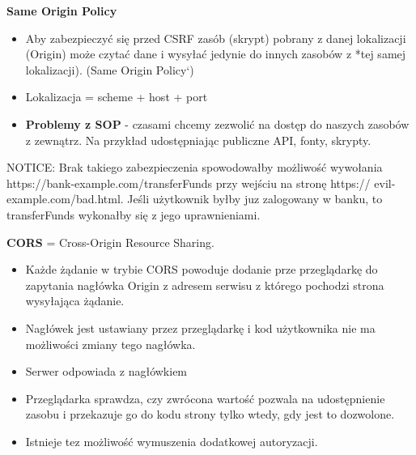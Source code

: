 \documentclass[../main.tex]{subfiles}
\begin{document}
    \textbf{Same Origin Policy}
    \begin{itemize}
        \item Aby zabezpieczyć się przed CSRF zasób (skrypt) pobrany z danej lokalizacji
        (Origin) może czytać dane i wysyłać jedynie do innych zasobów z *tej samej
        lokalizacji). (Same Origin Policy`)
        \item Lokalizacja = scheme + host + port
        \item \textbf{Problemy z SOP} - czasami chcemy zezwolić na dostęp do naszych zasobów z zewnątrz. Na
        przykład udostępniając publiczne API, fonty, skrypty.
    \end{itemize}

    NOTICE: Brak takiego zabezpieczenia spowodowałby możliwość wywołania
    https://bank-example.com/transferFunds przy wejściu na stronę https://
    evil-example.com/bad.html. Jeśli użytkownik byłby juz zalogowany w banku, to
    transferFunds wykonałby się z jego uprawnieniami.

    \textbf{CORS} = Cross-Origin Resource Sharing.
    \begin{itemize}
        \item Każde żądanie w trybie CORS powoduje dodanie prze przeglądarkę do
        zapytania nagłówka Origin z adresem serwisu z którego pochodzi strona
        wysyłająca żądanie.
        \item Nagłówek jest ustawiany przez przeglądarkę i kod użytkownika nie ma
        możliwości zmiany tego nagłówka.
        \item Serwer odpowiada z nagłówkiem
        \item Przeglądarka sprawdza, czy zwrócona wartość pozwala na udostępnienie
        zasobu i przekazuje go do kodu strony tylko wtedy, gdy jest to dozwolone.
        \item Istnieje tez możliwość wymuszenia dodatkowej autoryzacji.
    \end{itemize}
\end{document}
